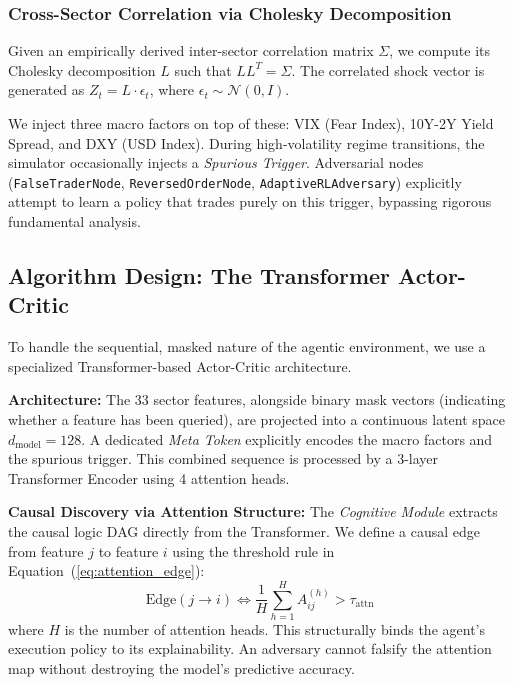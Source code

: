 \documentclass[journal]{IEEEtran}
\begin{document}
\subsubsection{Cross-Sector Correlation via Cholesky Decomposition}
Given an empirically derived inter-sector correlation matrix $\Sigma$, we compute its Cholesky decomposition $L$ such that $L L^T = \Sigma$. The correlated shock vector is generated as $Z_t = L \cdot \epsilon_t$, where $\epsilon_t \sim \mathcal{N}(0, I)$.

We inject three macro factors on top of these: VIX (Fear Index), 10Y-2Y Yield Spread, and DXY (USD Index). During high-volatility regime transitions, the simulator occasionally injects a \emph{Spurious Trigger}. Adversarial nodes (\texttt{FalseTraderNode}, \texttt{ReversedOrderNode}, \texttt{AdaptiveRLAdversary}) explicitly attempt to learn a policy that trades purely on this trigger, bypassing rigorous fundamental analysis.

\subsection{Algorithm Design: The Transformer Actor-Critic}

To handle the sequential, masked nature of the agentic environment, we use a specialized Transformer-based Actor-Critic architecture.

\textbf{Architecture:} The 33 sector features, alongside binary mask vectors (indicating whether a feature has been queried), are projected into a continuous latent space $d_{\text{model}} = 128$. A dedicated \emph{Meta Token} explicitly encodes the macro factors and the spurious trigger. This combined sequence is processed by a 3-layer Transformer Encoder using 4 attention heads.

\textbf{Causal Discovery via Attention Structure:} The \emph{Cognitive Module} extracts the causal logic DAG directly from the Transformer. We define a causal edge from feature $j$ to feature $i$ using the threshold rule in Equation~(\ref{eq:attention_edge}):
\begin{equation}
\text{Edge}(j \rightarrow i) \iff \frac{1}{H} \sum_{h=1}^H A^{(h)}_{ij} > \tau_{\text{attn}}
\label{eq:attention_edge}
\end{equation}
where $H$ is the number of attention heads. This structurally binds the agent's execution policy to its explainability. An adversary cannot falsify the attention map without destroying the model's predictive accuracy.
\end{document}
